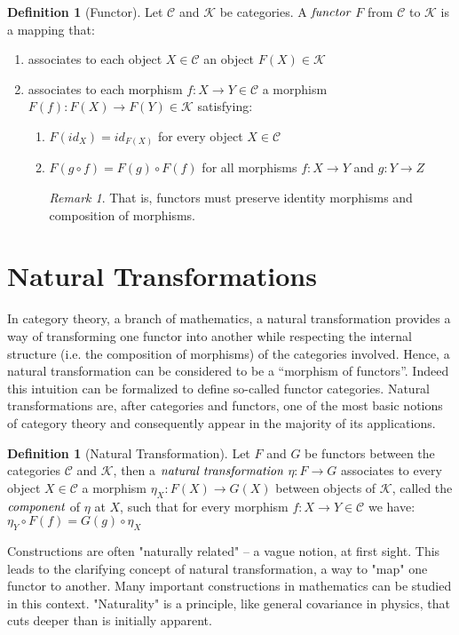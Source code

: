 \documentclass[10pt, oneside, reqno]{amsart}
\theoremstyle{plain}%
\theoremstyle{definition}
\newtheorem{defn}[thm]{Definition}
\theoremstyle{remark}
\newtheorem*{rem}{Remark}
\begin{document}
\begin{defn}[Functor]
	Let $\mathcal{C}$ and $\mathcal{K}$ be categories. A $\emph{functor}$ $F$ from $\mathcal{C}$ to $\mathcal{K}$ is a mapping that:
	\begin{enumerate}
		\item associates to each object $X \in \mathcal{C}$ an object $F(X) \in  \mathcal{K}$
		
		\item associates to each morphism $f : X \to Y \in \mathcal{C}$ a morphism $F(f) : F(X) \to F(Y) \in \mathcal{K}$
		satisfying:
		\begin{enumerate}
			\item $F(id_{X}) = id_{F(X)}$ for every object $X \in \mathcal{C}$
			
			\item $F(g \circ f) = F(g) \circ F(f)$ for all morphisms $f : X \to Y$ and $g : Y \to Z$
			\begin{rem}
				That is, functors must preserve identity morphisms and composition of morphisms.
			\end{rem}
		\end{enumerate}
	\end{enumerate}
\end{defn}

\section{Natural Transformations} %
\label{sec:natural transformations}
In category theory, a branch of mathematics, a natural transformation provides a way of transforming one functor into another
while respecting the internal structure (i.e. the composition of morphisms) of the categories involved.
Hence, a natural transformation can be considered to be a ``morphism of functors''.
Indeed this intuition can be formalized to define so-called functor categories.
Natural transformations are, after categories and functors, one of the most basic notions of category theory and consequently
appear in the majority of its applications.

\begin{defn}[Natural Transformation]
	Let $F$ and $G$ be functors between the categories $\mathcal{C}$ and $\mathcal{K}$, then a $\emph{natural transformation}$ $\eta : F \to G$
	associates to every object $X \in \mathcal{C}$ a morphism $\eta_{X} : F(X) \to G(X)$ between objects of $\mathcal{K}$, called the $\emph{component}$
	of $\eta$ at $X$, such that for every morphism $f : X \to Y \in \mathcal{C}$ we have:
	\\
	$\eta_{Y} \circ F(f) = G(g) \circ \eta_{X}$
\end{defn}
Constructions are often "naturally related" – a vague notion, at first sight.
This leads to the clarifying concept of natural transformation, a way to "map" one functor to another.
Many important constructions in mathematics can be studied in this context.
"Naturality" is a principle, like general covariance in physics, that cuts deeper than is initially apparent.
\end{document}
